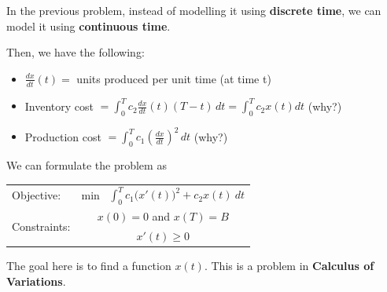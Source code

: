 \documentclass{workbook}
\begin{document}
\begin{slide}
\question \label{q:cv}

In the previous problem, instead of modelling it using \textbf{discrete time}, we can model it using \textbf{continuous time}.

Then, we have the following:
\begin{itemize}
	\item $\frac{dx}{dt}(t) = $ units produced per unit time (at time t)
	\item Inventory cost $\displaystyle= \int_0^T c_2 \frac{dx}{dt}(t) (T-t) \, dt = \int_0^T c_2 x(t) dt$ \hfill (why?)
	\item Production cost $\displaystyle= \int_0^T c_1 \left(\frac{dx}{dt}\right)^2 \, dt$
		\hfill (why?)
\end{itemize}
We can formulate the problem as
\begin{center}
\begin{tabular}[t]{lc}
	Objective: 						& min \ $\displaystyle\int_0^T c_1 \big(x'(t)\big)^2 + c_2 x(t) ~dt$ \\[10pt]
	\multirow{2}{*}{Constraints:} 	& $x(0)=0$ and $x(T)=B$ \\
				& $x'(t) \geq 0$
\end{tabular}
\end{center}

The goal here is to find a function $x(t)$. This is a problem in \textbf{Calculus of Variations}.
\end{slide}
\end{document}
